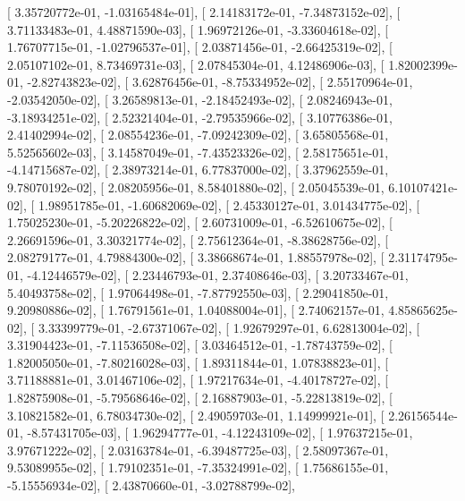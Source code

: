 \documentclass{article}
\begin{document}
       [  3.35720772e-01,  -1.03165484e-01],
       [  2.14183172e-01,  -7.34873152e-02],
       [  3.71133483e-01,   4.48871590e-03],
       [  1.96972126e-01,  -3.33604618e-02],
       [  1.76707715e-01,  -1.02796537e-01],
       [  2.03871456e-01,  -2.66425319e-02],
       [  2.05107102e-01,   8.73469731e-03],
       [  2.07845304e-01,   4.12486906e-03],
       [  1.82002399e-01,  -2.82743823e-02],
       [  3.62876456e-01,  -8.75334952e-02],
       [  2.55170964e-01,  -2.03542050e-02],
       [  3.26589813e-01,  -2.18452493e-02],
       [  2.08246943e-01,  -3.18934251e-02],
       [  2.52321404e-01,  -2.79535966e-02],
       [  3.10776386e-01,   2.41402994e-02],
       [  2.08554236e-01,  -7.09242309e-02],
       [  3.65805568e-01,   5.52565602e-03],
       [  3.14587049e-01,  -7.43523326e-02],
       [  2.58175651e-01,  -4.14715687e-02],
       [  2.38973214e-01,   6.77837000e-02],
       [  3.37962559e-01,   9.78070192e-02],
       [  2.08205956e-01,   8.58401880e-02],
       [  2.05045539e-01,   6.10107421e-02],
       [  1.98951785e-01,  -1.60682069e-02],
       [  2.45330127e-01,   3.01434775e-02],
       [  1.75025230e-01,  -5.20226822e-02],
       [  2.60731009e-01,  -6.52610675e-02],
       [  2.26691596e-01,   3.30321774e-02],
       [  2.75612364e-01,  -8.38628756e-02],
       [  2.08279177e-01,   4.79884300e-02],
       [  3.38668674e-01,   1.88557978e-02],
       [  2.31174795e-01,  -4.12446579e-02],
       [  2.23446793e-01,   2.37408646e-03],
       [  3.20733467e-01,   5.40493758e-02],
       [  1.97064498e-01,  -7.87792550e-03],
       [  2.29041850e-01,   9.20980886e-02],
       [  1.76791561e-01,   1.04088004e-01],
       [  2.74062157e-01,   4.85865625e-02],
       [  3.33399779e-01,  -2.67371067e-02],
       [  1.92679297e-01,   6.62813004e-02],
       [  3.31904423e-01,  -7.11536508e-02],
       [  3.03464512e-01,  -1.78743759e-02],
       [  1.82005050e-01,  -7.80216028e-03],
       [  1.89311844e-01,   1.07838823e-01],
       [  3.71188881e-01,   3.01467106e-02],
       [  1.97217634e-01,  -4.40178727e-02],
       [  1.82875908e-01,  -5.79568646e-02],
       [  2.16887903e-01,  -5.22813819e-02],
       [  3.10821582e-01,   6.78034730e-02],
       [  2.49059703e-01,   1.14999921e-01],
       [  2.26156544e-01,  -8.57431705e-03],
       [  1.96294777e-01,  -4.12243109e-02],
       [  1.97637215e-01,   3.97671222e-02],
       [  2.03163784e-01,  -6.39487725e-03],
       [  2.58097367e-01,   9.53089955e-02],
       [  1.79102351e-01,  -7.35324991e-02],
       [  1.75686155e-01,  -5.15556934e-02],
       [  2.43870660e-01,  -3.02788799e-02],
\end{document}
